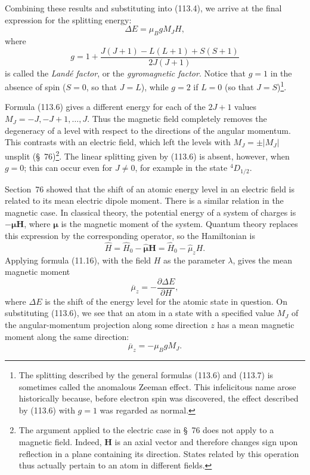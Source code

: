 Combining these results and substituting into (113.4), we arrive at the final expression for the splitting energy:
\begin{equation}
 \Delta E=\mu_BgM_JH,
 \tag{113.6}
\end{equation}
where
\begin{equation}
 g=1+\frac{J(J+1)-L(L+1)+S(S+1)}{2J(J+1)}
 \tag{113.7}
\end{equation}
is called the \emph{Landé factor}, or the \emph{gyromagnetic factor}. Notice that $g=1$ in the absence of spin ($S=0$, so that $J=L$), while $g=2$ if $L=0$ (so that $J=S$)\footnote{The splitting described by the general formulas (113.6) and (113.7) is sometimes called the anomalous Zeeman effect. This infelicitous name arose historically because, before electron spin was discovered, the effect described by (113.6) with $g=1$ was regarded as normal.}.

Formula (113.6) gives a different energy for each of the $2J+1$ values $M_J=-J,-J+1,\ldots,J$. Thus the magnetic field completely removes the degeneracy of a level with respect to the directions of the angular momentum. This contrasts with an electric field, which left the levels with $M_J=\pm|M_J|$ unsplit (§~76)\footnote{The argument applied to the electric case in §~76 does not apply to a magnetic field. Indeed, $\mathbf H$ is an axial vector and therefore changes sign upon reflection in a plane containing its direction. States related by this operation thus actually pertain to an atom in different fields.}. The linear splitting given by (113.6) is absent, however, when $g=0$; this can occur even for $J\ne0$, for example in the state ${}^4D_{1/2}$.

Section~76 showed that the shift of an atomic energy level in an electric field is related to its mean electric dipole moment. There is a similar relation in the magnetic case. In classical theory, the potential energy of a system of charges is $-\boldsymbol\mu\mathbf H$, where $\boldsymbol\mu$ is the magnetic moment of the system. Quantum theory replaces this expression by the corresponding operator, so the Hamiltonian is
\[
 \hat H=\hat H_0-\hat{\boldsymbol\mu}\mathbf H=\hat H_0-\hat\mu_zH.
\]
Applying formula (11.16), with the field $H$ as the parameter $\lambda$, gives the mean magnetic moment
\begin{equation}
 \overline\mu_z=-\frac{\partial\Delta E}{\partial H},
 \tag{113.8}
\end{equation}
where $\Delta E$ is the shift of the energy level for the atomic state in question. On substituting (113.6), we see that an atom in a state with a specified value $M_J$ of the angular-momentum projection along some direction $z$ has a mean magnetic moment along the same direction:
\begin{equation}
 \overline\mu_z=-\mu_BgM_J.
 \tag{113.9}
\end{equation}

